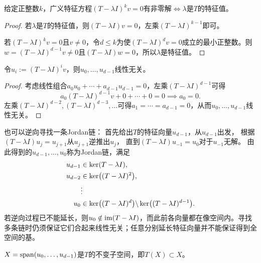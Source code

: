 \begin{theorem}{}{}
	给定正整数$k$，广义特征方程$(T - \lambda I)^kv = 0$有非零解$\iff \lambda$是$T$的特征值。
\end{theorem}

\begin{proof}
	若$\lambda$是$T$的特征值，则$(T - \lambda I)v = 0$，左乘$(T - \lambda I)^{k-1}$即可。
	
	若$(T - \lambda I)^kv = 0$且$v \neq 0$，令$d \leq k$为使$(T - \lambda I)^dv = 0$成立的最小正整数。则$w = (T - \lambda I)^{d-1}v \neq 0$且$(T - \lambda I)w = 0$，所以$\lambda$是特征值。
\end{proof}

\begin{theorem}{}{}
	令$u_i := (T - \lambda I)^iv$，则$u_0,\ldots,u_{d-1}$线性无关。
\end{theorem}

\begin{proof}
	考虑线性组合$a_0u_0 + \cdots + a_{d-1}u_{d-1} = 0$，左乘$(T - \lambda I)^{d-1}$可得
	\[
		a_0(T - \lambda I)^{d-1}v + 0 + \cdots + 0 = 0 \implies a_0 = 0.
	\]
	左乘$(T - \lambda I)^{d-2},(T - \lambda I)^{d-3},\ldots$可得$a_1 = \cdots = a_{d-1} = 0$，从而$u_0,\ldots,u_{d-1}$线性无关。
\end{proof}

\begin{remark}
	也可以逆向寻找一条Jordan链：
	首先给出$T$的特征向量$u_{d-1}$，从$u_{d-1}$出发，
	根据$(T - \lambda I)u_j = u_{j+1}$从$u_{j+1}$逆推出$u_j$，
	直到$(T - \lambda I)u_{-1} = u_0$对于$u_{-1}$无解。
	由此得到的$u_{d-1},\ldots,u_0$称为Jordan链，满足
	\begin{equation}\label{eq:la-jordan-chain-kernels}
		\begin{aligned}
			u_{d-1} &\in \ker(T - \lambda I),\\
			u_{d-2} &\in \ker\bigl((T - \lambda I)^2\bigr),\\
			&\vdots\\
			u_0 &\in \ker\bigl((T - \lambda I)^d\bigr)\backslash\ker\bigl((T - \lambda I)^{d-1}\bigr).
		\end{aligned}
	\end{equation}
	若逆向过程已不能延长，则$u_0 \notin \operatorname{im}(T - \lambda I)$，而此前各向量都在像空间内。寻找多条链时仍须保证它们合起来线性无关；任意分别延长特征向量并不能保证得到全空间的基。
\end{remark}

\begin{theorem}{}{}
	$X = \operatorname{span}(u_0,\ldots,u_{d-1})$是$T$的不变子空间，即$T(X) \subset X$。
\end{theorem}

